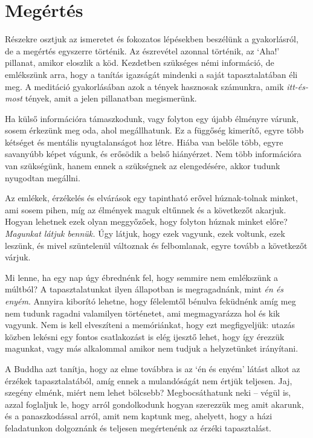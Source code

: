 \chapter{Megértés}

Részekre osztjuk az ismeretet és fokozatos lépésekben beszélünk a
gyakorlásról, de a megértés egyszerre történik. Az észrevétel azonnal
történik, az `Aha!' pillanat, amikor eloszlik a köd. Kezdetben szükséges
némi információ, de emlékszünk arra, hogy a tanítás igazságát mindenki a
saját tapasztalatában éli meg. A meditáció gyakorlásában azok a tények
hasznosak számunkra, amik \emph{itt-és-most} tények, amit a jelen
pillanatban megismerünk.

Ha külső információra támaszkodunk, vagy folyton egy újabb élményre
várunk, sosem érkezünk meg oda, ahol megállhatunk. Ez a függőség
kimerítő, egyre több kétséget és mentális nyugtalanságot hoz létre.
Hiába van belőle több, egyre savanyúbb képet vágunk, és erősödik a belső
hiányérzet. Nem több információra van szükségünk, hanem ennek a
szükségnek az elengedésére, akkor tudunk nyugodtan megállni.

Az emlékek, érzékelés és elvárások egy tapintható erővel húznak-tolnak
minket, ami sosem pihen, míg az élmények maguk eltűnnek és a következőt
akarjuk. Hogyan lehetnek ezek olyan meggyőzőek, hogy folyton húznak
minket előre? \emph{Magunkat látjuk bennük.} Úgy látjuk, hogy ezek
vagyunk, ezek voltunk, ezek leszünk, és mivel szüntelenül változnak és
felbomlanak, egyre tovább a következőt várjuk.

Mi lenne, ha egy nap úgy ébrednénk fel, hogy semmire nem emlékszünk a
múltból? A tapasztalatunkat ilyen állapotban is megragadnánk, mint
\emph{én és enyém}. Annyira kiborító lehetne, hogy félelemtől bénulva
feküdnénk amíg meg nem tudunk ragadni valamilyen történetet, ami
megmagyarázza hol és kik vagyunk. Nem is kell elveszíteni a memóriánkat,
hogy ezt megfigyeljük: utazás közben lekésni egy fontos csatlakozást is
elég ijesztő lehet, hogy így érezzük magunkat, vagy más alkalommal
amikor nem tudjuk a helyzetünket irányítani.

A Buddha azt tanítja, hogy az elme továbbra is az `én és enyém' látást
alkot az érzékek tapasztalatából, amíg ennek a mulandóságát nem értjük
teljesen. Jaj, szegény elménk, miért nem lehet bölcsebb? Megbocsáthatunk
neki -- végül is, azzal foglaljuk le, hogy arról gondolkodunk hogyan
szerezzük meg amit akarunk, és a panaszkodással arról, amit nem kaptunk
meg, ahelyett, hogy a házi feladatunkon dolgoznánk és teljesen
megértenénk az érzéki tapasztalást.

